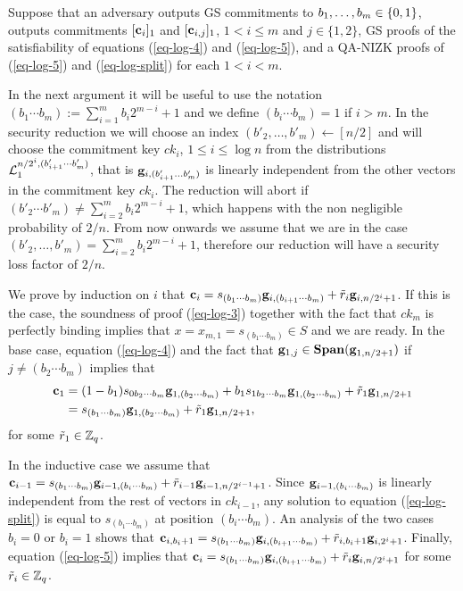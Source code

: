Suppose that an adversary outputs GS commitments to $b_1,\ldots,b_{m}\in\{0,1\}$, outputs commitments $[\mathbf{c}_i]_1$ and $[\mathbf{c}_{i,j}]_1$, $1< i\leq m$ and $j\in\{1,2\}$, GS proofs of the satisfiability of equations (\ref{eq-log-4}) and (\ref{eq-log-5}), and a QA-NIZK proofs of (\ref{eq-log-5}) and (\ref{eq-log-split}) for each $1<i<m$.

In the next argument it will be useful to use the notation $(b_1\cdots b_m):=\sum_{i=1}^{m}b_i2^{m-i}+1$ and we define $(b_i\cdots b_m)=1$ if $i>m$.
In the security reduction we will choose an index $(b'_2,\ldots,b'_m)\gets[n/2]$ and will choose the commitment key $ck_i$, $1\leq i \leq \log n$ from the distributions $\mathcal{L}_1^{n/2^i,(b'_{i+1}\cdots b'_m)}$, that is $\mathbf{g}_{i,(b'_{i+1}\ldots b'_m)}$ is linearly independent from the other vectors in the commitment key $ck_i$. The reduction will abort if $(b'_2\cdots b'_m)\neq\sum_{i=2}^{m} b_i2^{m-i}+1$, which happens with the non negligible probability of $2/n$. From now onwards we assume that we are in the case $(b'_2,\ldots,b'_m)=\sum_{i=2}^{m} b_i2^{m-i}+1$, therefore our reduction will have a security loss factor of $2/n$.

We prove by induction on $i$ that $\mathbf{c}_i=s_{(b_1\cdots b_m)}\mathbf{g}_{i,(b_{i+1}\cdots b_m)}+\tilde{r}_i\mathbf{g}_{i,n/2^i+1}$. If this is the case, the soundness of proof (\ref{eq-log-3}) together with the fact that $ck_m$ is perfectly binding implies that $x=x_{m,1}=s_{(b_1\cdots b_m)}\in S$ and we are ready. In the base case, equation (\ref{eq-log-4}) and the fact that $\mathbf{g}_{1,j}\in\mathbf{Span}(\mathbf{g}_{1,n/2+1})$ if $j\neq (b_2\cdots b_m)$ implies that 
\begin{align*}
\mathbf{c}_1 &= (1-b_1)s_{0b_2\cdots b_m} \mathbf{g}_{1,(b_2\cdots b_m)}+b_1s_{1b_2\cdots b_m}\mathbf{g}_{1,(b_2\cdots b_m)}+\tilde{r}_1\mathbf{g}_{1,n/2+1}\\
&=s_{(b_1\cdots b_m)}\mathbf{g}_{1,(b_2\cdots b_m)}+\tilde{r}_1\mathbf{g}_{1,n/2+1},
\end{align*} for some $\tilde{r}_1\in\mathbb{Z}_q$.

In the inductive case we assume that $\mathbf{c}_{i-1}=s_{(b_1\cdots b_m)}\mathbf{g}_{i-1,(b_i\cdots b_m)}+\tilde{r}_{i-1}\mathbf{g}_{i-1,n/2^{i-1}+1}$. Since $\mathbf{g}_{i-1,(b_i\cdots b_m)}$ is linearly independent from the rest of vectors in $ck_{i-1}$, any solution to equation (\ref{eq-log-split}) is equal to $s_{(b_1\cdots b_m)}$ at position $(b_i\cdots b_m)$. An analysis of the two cases $b_i=0$ or $b_i=1$ shows that $\mathbf{c}_{i,b_i+1}=s_{(b_1\cdots b_m)}\mathbf{g}_{i,(b_{i+1}\cdots b_m)}+\tilde{r}_{i,b_i+1}\mathbf{g}_{i,2^i+1}$. Finally, equation (\ref{eq-log-5}) implies that $\mathbf{c}_i=s_{(b_1\cdots b_m)}\mathbf{g}_{i,(b_{i+1}\cdots b_m)}+\tilde{r}_i\mathbf{g}_{i,n/2^i+1}$ for some $\tilde{r}_{i}\in\mathbb{Z}_q$.

